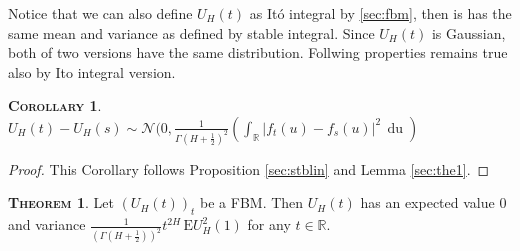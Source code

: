 \documentclass[a4paper, twoside, 11pt]{article}
\theoremstyle{definition}
\newtheorem{theorem}[definition]{\scshape Theorem}
\newtheorem{corollary}[definition]{\scshape Corollary}
\begin{document}
Notice that we can also define $U_H(t)$ as It\'o integral by \ref{sec:fbm}, then is has the same mean and variance as defined by stable integral. Since $U_H(t)$ is Gaussian, both of two versions have the same distribution. Follwing properties remains true also by Ito integral version.
\begin{corollary}
  $U_H(t)-U_H(s) \sim \mathcal{N}(0, \frac{1}{\Gamma(H+\frac{1}{2})^2}(\int_{\mathbb{R}} |f_t(u)-f_s(u)|^2\, \mathop{du})$
  \label{sec:the2}
\end{corollary}
\begin{proof}
  This Corollary follows Proposition \ref{sec:stblin} and Lemma \ref{sec:the1}.
\end{proof}
\begin{theorem}
  Let $(U_H(t))_t$ be a FBM. Then $U_H(t)$ has an expected value $0$ and variance $\frac{1}{(\Gamma(H+\frac{1}{2}))^2}t^{2H}\, \mathrm{E} U^2_H(1)$ for any $t \in \mathbb{R}$.
  \label{sec:fbmp1}
\end{theorem}
\end{document}
